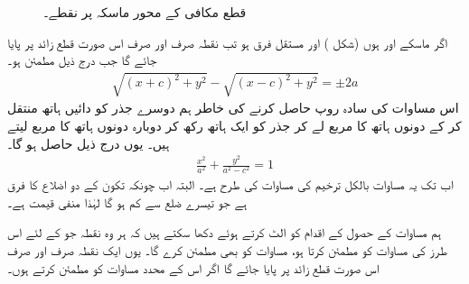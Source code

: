 \begin{figure}
\begin{minipage}{0.45\textwidth}
\caption{قطع مکافی کے محور ماسکہ پر نقطے۔}
\label{شکل_مخروط_قطع_زائد_ب}
\end{minipage}
\end{figure}

اگر ماسکے  اور  ہوں  (شکل ) اور مستقل فرق  ہو تب نقطہ  صرف اور صرف اس صورت قطع زائد پر پایا جائے گا جب درج ذیل مطمئن ہو۔
\begin{align}\label{مساوات_مخروط_قطع_مکافی_الف}
\sqrt{(x+c)^2+y^2}-\sqrt{(x-c)^2+y^2}=\pm 2a
\end{align} 
اس مساوات کی سادہ روپ حاصل کرنے کی خاطر ہم دوسرے جذر کو دائیں ہاتھ منتقل کر کے دونوں ہاتھ کا مربع لے کر جذر کو ایک ہاتھ رکھ کر دوبارہ دونوں ہاتھ کا مربع لیتے ہیں۔ یوں درج ذیل حاصل ہو گا۔
\begin{align}\label{مساوات_مخروط_قطع_مکافی_ب}
\frac{x^2}{a^2}+\frac{y^2}{a^2-c^2}=1
\end{align}
اب تک یہ مساوات بالکل ترخیم کی مساوات کی طرح ہے۔ البتہ اب چونکہ تکون  کے دو اضلاع کا فرق  ہے جو تیسرے ضلع  سے کم ہو گا لہٰذا  منفی قیمت ہے۔

ہم مساوات  کے حصول کے اقدام کو الٹ کرتے ہوئے دکھا سکتے ہیں کہ ہر وہ نقطہ  جو  کے لئے اس طرز کی مساوات کو مطمئن کرتا ہو، مساوات  کو بھی مطمئن کرے گا۔ یوں ایک نقطہ صرف اور صرف اس صورت قطع زائد پر پایا جائے گا اگر اس کے محدد مساوات  کو مطمئن کرتے ہوں۔

